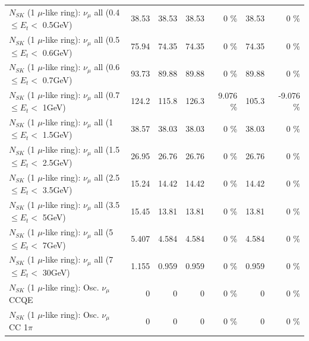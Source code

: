 \begin{table}
\begin{tabular}{| l | r | r | r  r | r  r |}
       $N_{SK}$ (1 $\mu$-like ring): $\nu_{\mu}$ all (0.4 $\leq E_{t} <$ 0.5GeV) &           38.53 &           38.53 &           38.53 &        0 \%  &           38.53 &        0 \%  \\ 
       $N_{SK}$ (1 $\mu$-like ring): $\nu_{\mu}$ all (0.5 $\leq E_{t} <$ 0.6GeV) &           75.94 &           74.35 &           74.35 &        0 \%  &           74.35 &        0 \%  \\ 
       $N_{SK}$ (1 $\mu$-like ring): $\nu_{\mu}$ all (0.6 $\leq E_{t} <$ 0.7GeV) &           93.73 &           89.88 &           89.88 &        0 \%  &           89.88 &        0 \%  \\ 
         $N_{SK}$ (1 $\mu$-like ring): $\nu_{\mu}$ all (0.7 $\leq E_{t} <$ 1GeV) &           124.2 &           115.8 &           126.3 &    9.076 \%  &           105.3 &   -9.076 \%  \\ 
         $N_{SK}$ (1 $\mu$-like ring): $\nu_{\mu}$ all (1 $\leq E_{t} <$ 1.5GeV) &           38.57 &           38.03 &           38.03 &        0 \%  &           38.03 &        0 \%  \\ 
       $N_{SK}$ (1 $\mu$-like ring): $\nu_{\mu}$ all (1.5 $\leq E_{t} <$ 2.5GeV) &           26.95 &           26.76 &           26.76 &        0 \%  &           26.76 &        0 \%  \\ 
       $N_{SK}$ (1 $\mu$-like ring): $\nu_{\mu}$ all (2.5 $\leq E_{t} <$ 3.5GeV) &           15.24 &           14.42 &           14.42 &        0 \%  &           14.42 &        0 \%  \\ 
         $N_{SK}$ (1 $\mu$-like ring): $\nu_{\mu}$ all (3.5 $\leq E_{t} <$ 5GeV) &           15.45 &           13.81 &           13.81 &        0 \%  &           13.81 &        0 \%  \\ 
           $N_{SK}$ (1 $\mu$-like ring): $\nu_{\mu}$ all (5 $\leq E_{t} <$ 7GeV) &           5.407 &           4.584 &           4.584 &        0 \%  &           4.584 &        0 \%  \\ 
          $N_{SK}$ (1 $\mu$-like ring): $\nu_{\mu}$ all (7 $\leq E_{t} <$ 30GeV) &           1.155 &           0.959 &           0.959 &        0 \%  &           0.959 &        0 \%  \\ 
\hline
\hline
                               $N_{SK}$ (1 $\mu$-like ring): Osc. $\nu_\mu$ CCQE &               0 &               0 &               0 &        0 \%  &               0 &        0 \%  \\ 
                          $N_{SK}$ (1 $\mu$-like ring): Osc. $\nu_\mu$ CC 1$\pi$ &               0 &               0 &               0 &        0 \%  &               0 &        0 \%  \\ 

\end{tabular}
\end{table}
